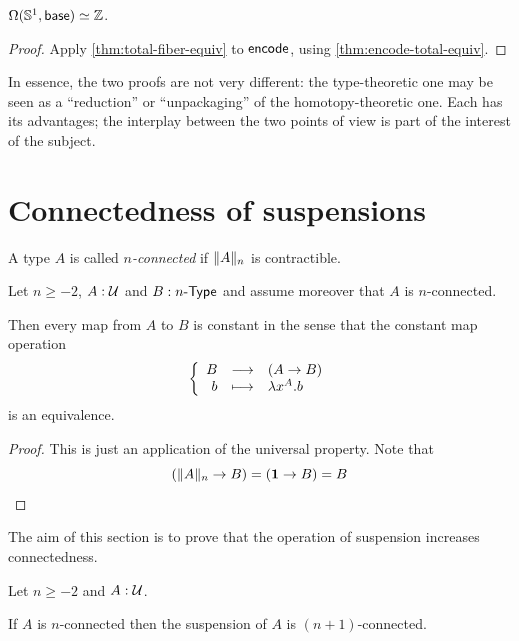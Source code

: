 \begin{thm}
  $\eqv {\Omega(\Sn^1,\base)} {\Z}$.
\end{thm}
\begin{proof}
  Apply \autoref{thm:total-fiber-equiv} to $\encode$, using \autoref{thm:encode-total-equiv}.
\end{proof}

In essence, the two proofs are not very different: the type-theoretic one may be seen as a ``reduction'' or ``unpackaging'' of the homotopy-theoretic one.
Each has its advantages; the interplay between the two points of view is part of the interest of the subject.


\section{Connectedness of suspensions}
\label{sec:conn-susp}

\begin{defn}
  A type $A$ is called \emph{$n$-connected} if $\trunc nA$ is contractible.
\end{defn}

\begin{lem}
  \label{connectedtotruncated}
  Let $n\ge-2$, $A:\type$ and $B:\typele{n}$ and assume moreover that $A$ is
  $n$-connected.

  Then every map from $A$ to $B$ is constant in the sense that the constant map
  operation
  \[\function{B}{(A\to{}B)}{b}{\lambda{}x^A.b}\]
  is an equivalence.
\end{lem}
\begin{proof}
  This is just an application of the universal property. Note that
  \[(\trunc nA\to{}B)=(\unit\to{}B)=B \qedhere\]
\end{proof}

The aim of this section is to prove that the operation of suspension increases
connectedness.

\begin{thm}
  Let $n\ge-2$ and $A:\type$.

  If $A$ is $n$-connected then the suspension of $A$ is $(n+1)$-connected.
\end{thm}

